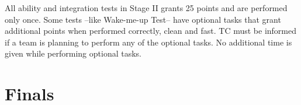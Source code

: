 \documentclass[a4paper]{article}
\begin{document}
\begin{itshape}
All ability and integration tests in Stage II grants 25 points and are performed only once. Some tests --like Wake-me-up Test-- have optional tasks that grant additional points when performed correctly, clean and fast. TC must be informed if a team is planning to perform any of the optional tasks. No additional time is given while performing optional tasks.
\end{itshape}







\section{Finals}
\end{document}
